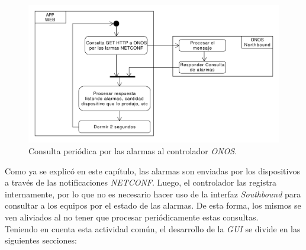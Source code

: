 \begin{figure}[H]
    \centering
    \includegraphics[scale=0.45]{Figures/consulta_alarmas.pdf}
    \caption{Consulta periódica por las alarmas al controlador \textit{ONOS}.}
    \label{fig:consulta_alarmas}
  \end{figure}

  Como ya se explicó en este capítulo, las alarmas son enviadas por los dispositivos a través de las notificaciones \textit{NETCONF}. Luego, el controlador las registra internamente, por lo que no es necesario hacer uso de la interfaz \textit{Southbound} para consultar a los equipos por el estado de las alarmas. De esta forma, los mismos se ven aliviados al no tener que procesar periódicamente estas consultas.
  \\

  Teniendo en cuenta esta actividad común, el desarrollo de la \textit{GUI} se divide en las siguientes secciones:

